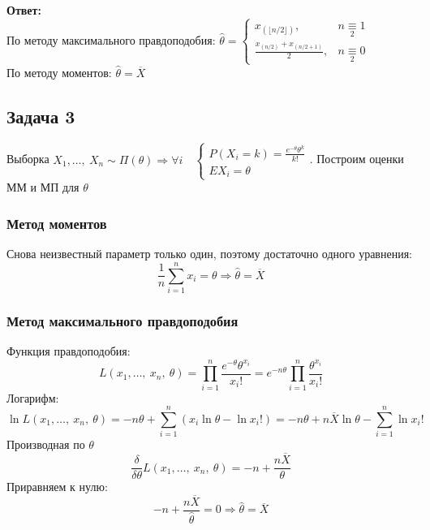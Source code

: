 \documentclass[12pt, a4paper]{article}
\begin{document}
\textbf{Ответ:}\\
По методу максимального правдоподобия: $\hat \theta = \begin{cases}
    x_{(\lfloor n/2 \rfloor)}, & n\underset{2}{\equiv} 1\\
    \frac{x_{(n/2)} + x_{(n/2 + 1)}}{2}, & n\underset{2}{\equiv} 0
\end{cases}$\\
По методу моментов: $\hat \theta = \overline{X}$
\subsection*{Задача 3}
Выборка $X_1,\dots,\ X_n \sim \Pi(\theta)\Rightarrow \forall i\quad \begin{cases}
    P(X_i = k) = \frac{e^{-\theta} \theta^k}{k!}\\
    EX_i = \theta
\end{cases}$. Построим оценки ММ и МП для $\theta$
\subsubsection*{Метод моментов}
Снова неизвестный параметр только один, поэтому достаточно одного уравнения:
\begin{equation*}
    \frac{1}{n} \sum_{i = 1}^{n} x_i = \theta\Rightarrow \hat \theta = \overline{X}
\end{equation*}
\subsubsection*{Метод максимального правдоподобия}
Функция правдоподобия:
\begin{equation*}
    L(x_1,\dots,\ x_n,\ \theta) = \prod_{i = 1}^{n} \frac{e^{-\theta} \theta^{x_i}}{x_i!} = e^{-n\theta} \prod_{i = 1}^{n} \frac{\theta^{x_i}}{x_i!}
\end{equation*}
Логарифм:
\begin{equation*}
    \ln L(x_1,\dots,\ x_n,\ \theta) = -n\theta + \sum_{i = 1}^{n} (x_i\ln \theta - \ln x_i!) = -n\theta + n\overline{X}\ln\theta  - \sum_{i = 1}^{n} \ln x_i!
\end{equation*}
Производная по $\theta$
\begin{equation*}
    \frac{\delta}{\delta \theta} L(x_1,\dots,\ x_n,\ \theta) = -n + \frac{n\overline{X}}{\theta}
\end{equation*}
Приравняем к нулю:
\begin{equation*}
    -n + \frac{n\overline{X}}{\hat\theta} = 0 \Rightarrow \hat\theta = \overline{X}
\end{equation*}
\end{document}
